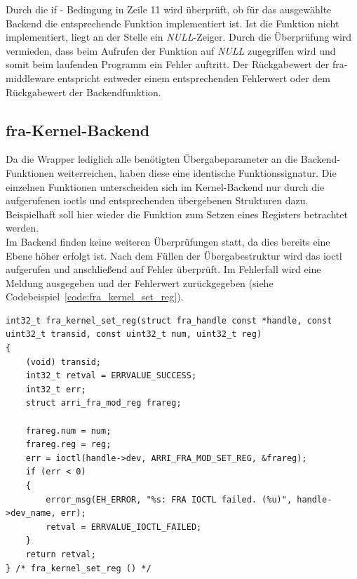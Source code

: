 Durch die if - Bedingung in Zeile 11 wird überprüft, ob für das ausgewählte Backend die entsprechende Funktion implementiert ist. Ist die Funktion nicht implementiert, liegt an der Stelle ein \textit{NULL}-Zeiger. Durch die Überprüfung wird vermieden, dass beim Aufrufen der Funktion auf \textit{NULL} zugegriffen wird und somit beim laufenden Programm ein Fehler auftritt. Der Rückgabewert der \ac{fra}-\gls{middleware} entspricht entweder einem entsprechenden Fehlerwert oder dem Rückgabewert der Backendfunktion. 


\subsection{\acs{fra}-Kernel-Backend}
Da die Wrapper lediglich alle benötigten Übergabeparameter an die Backend-Funktionen weiterreichen, haben diese eine identische Funktionssignatur. 
Die einzelnen Funktionen unterscheiden sich im Kernel-Backend nur durch die aufgerufenen \ac{ioctl}s und entsprechenden übergebenen Strukturen dazu. Beispielhaft soll hier wieder die Funktion zum Setzen eines Registers betrachtet werden. \\


Im Backend finden keine weiteren Überprüfungen statt, da dies bereits eine Ebene höher erfolgt ist. Nach dem Füllen der Übergabestruktur wird das \ac{ioctl} aufgerufen und anschließend auf Fehler überprüft. 
Im Fehlerfall wird eine Meldung ausgegeben und der Fehlerwert zurückgegeben (siehe Codebeispiel~\ref{code:fra_kernel_set_reg}). 


\begin{lstfloat}
\begin{lstlisting}
int32_t fra_kernel_set_reg(struct fra_handle const *handle, const uint32_t transid, const uint32_t num, uint32_t reg)
{
	(void) transid;
	int32_t retval = ERRVALUE_SUCCESS;
	int32_t err;
	struct arri_fra_mod_reg frareg;
	
	frareg.num = num;
	frareg.reg = reg;
	err = ioctl(handle->dev, ARRI_FRA_MOD_SET_REG, &frareg);
	if (err < 0)
	{
		error_msg(EH_ERROR, "%s: FRA IOCTL failed. (%u)", handle->dev_name, err);
		retval = ERRVALUE_IOCTL_FAILED;
	}  
	return retval;
} /* fra_kernel_set_reg () */
\end{lstlisting}
\end{lstfloat}

